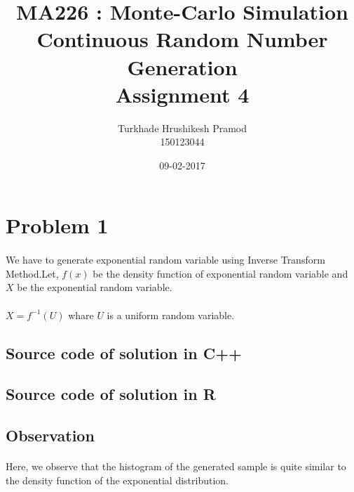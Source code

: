 \documentclass{article}
\title{%
	MA226 : Monte-Carlo Simulation\\
	 Continuous Random Number Generation\\
	 \large Assignment 4}
\date{09-02-2017}
\author{%
	Turkhade Hrushikesh Pramod\\
	150123044	}
\begin{document}
	\maketitle
	
	\newpage
	
	\section{Problem 1}
	\paragraph{}
		We have to generate exponential random variable using Inverse Transform Method.Let, $f(x)$ be the density function of exponential random variable and $X$ be the exponential random variable.
		\paragraph{}
		$X = f^{-1}(U)$ whare $U$ is a uniform random variable.
		
		
	\subsection{Source code of solution in C++}
		
	
	\subsection{Source code of solution in R}
		
		
		\pagebreak
		\subsection{Observation}
		\paragraph{}
			Here, we observe that the histogram of the generated sample is quite similar to the density function of the exponential distribution.
			
\end{document}
